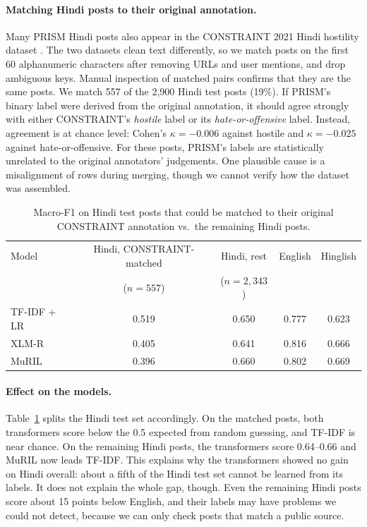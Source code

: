 \documentclass[11pt,a4paper]{article}
\begin{document}
\paragraph{Matching Hindi posts to their original annotation.}
Many PRISM Hindi posts also appear in the CONSTRAINT 2021 Hindi hostility dataset \citep{bhardwaj2020hostility,patwa2021constraint}.
The two datasets clean text differently, so we match posts on the first 60 alphanumeric characters after removing URLs and user mentions, and drop ambiguous keys.
Manual inspection of matched pairs confirms that they are the same posts.
We match 557 of the 2,900 Hindi test posts (19\%).
If PRISM's binary label were derived from the original annotation, it should agree strongly with either CONSTRAINT's \emph{hostile} label or its \emph{hate-or-offensive} label.
Instead, agreement is at chance level: Cohen's $\kappa = -0.006$ against hostile and $\kappa = -0.025$ against hate-or-offensive.
For these posts, PRISM's labels are statistically unrelated to the original annotators' judgements. One plausible cause is a misalignment of rows during merging, though we cannot verify how the dataset was assembled.

\begin{table}[h]
\centering
\small
\begin{tabular}{lcccc}
\toprule
Model & Hindi, CONSTRAINT-matched & Hindi, rest & English & Hinglish \\
 & ($n=557$) & ($n=2{,}343$) & & \\
\midrule
TF-IDF + LR & 0.519 & 0.650 & 0.777 & 0.623 \\
XLM-R & 0.405 & 0.641 & 0.816 & 0.666 \\
MuRIL & 0.396 & 0.660 & 0.802 & 0.669 \\
\bottomrule
\end{tabular}
\caption{Macro-F1 on Hindi test posts that could be matched to their original CONSTRAINT annotation vs.\ the remaining Hindi posts.}
\label{tab:constraint}
\end{table}

\paragraph{Effect on the models.}
Table~\ref{tab:constraint} splits the Hindi test set accordingly.
On the matched posts, both transformers score below the 0.5 expected from random guessing, and TF-IDF is near chance.
On the remaining Hindi posts, the transformers score 0.64--0.66 and MuRIL now leads TF-IDF.
This explains why the transformers showed no gain on Hindi overall: about a fifth of the Hindi test set cannot be learned from its labels.
It does not explain the whole gap, though. Even the remaining Hindi posts score about 15 points below English, and their labels may have problems we could not detect, because we can only check posts that match a public source.
\end{document}
